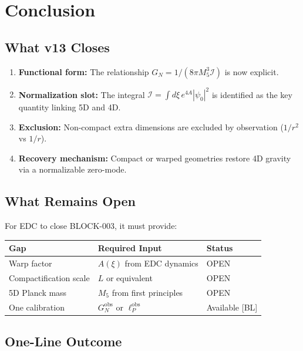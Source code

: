 \documentclass[11pt,a4paper]{article}
\newcommand{\Mfive}{M_5}
\newcommand{\GN}{G_N}
\newcommand{\calI}{\mathcal{I}}
\begin{document}
\section{Conclusion}
\label{sec:conclusion}

\subsection{What v13 Closes}

\begin{enumerate}
    \item \textbf{Functional form:} The relationship $\GN = 1/(8\pi\Mfive^3\calI)$
          is now explicit.

    \item \textbf{Normalization slot:} The integral $\calI = \int d\xi \, e^{4A} |\psi_0|^2$
          is identified as the key quantity linking 5D and 4D.

    \item \textbf{Exclusion:} Non-compact extra dimensions are excluded by
          observation ($1/r^2$ vs $1/r$).

    \item \textbf{Recovery mechanism:} Compact or warped geometries restore
          4D gravity via a normalizable zero-mode.
\end{enumerate}

\subsection{What Remains Open}

For EDC to close BLOCK-003, it must provide:
\begin{center}
\begin{tabular}{@{}lll@{}}
\toprule
\textbf{Gap} & \textbf{Required Input} & \textbf{Status} \\
\midrule
Warp factor & $A(\xi)$ from EDC dynamics & OPEN \\
Compactification scale & $L$ or equivalent & OPEN \\
5D Planck mass & $\Mfive$ from first principles & OPEN \\
One calibration & $\GN^{\text{obs}}$ or $\ell_P^{\text{obs}}$ & Available [BL] \\
\bottomrule
\end{tabular}
\end{center}

\subsection{One-Line Outcome}
\end{document}
